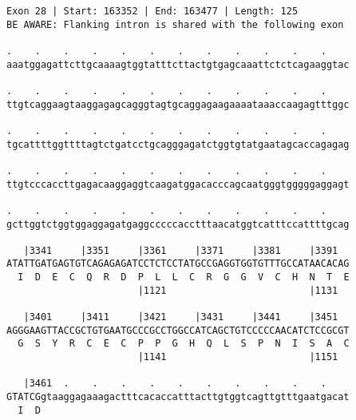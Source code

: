 \documentclass{article}
\begin{document}
\begin{Verbatim}
Exon 28 | Start: 163352 | End: 163477 | Length: 125
BE AWARE: Flanking intron is shared with the following exon
 
.    .    .    .    .    .    .    .    .    .    .    .    
aaatggagattcttgcaaaagtggtatttcttactgtgagcaaattctctcagaaggtac
  
.    .    .    .    .    .    .    .    .    .    .    .    
ttgtcaggaagtaaggagagcagggtagtgcaggagaagaaaataaaccaagagtttggc
  
.    .    .    .    .    .    .    .    .    .    .    .    
tgcattttggttttagtctgatcctgcagggagatctggtgtatgaatagcaccagagag
  
.    .    .    .    .    .    .    .    .    .    .    .    
ttgtcccaccttgagacaaggaggtcaagatggacacccagcaatgggtgggggaggagt
  
.    .    .    .    .    .    .    .    .    .    .    .    
gcttggtctggtggaggagatgaggcccccacctttaacatggtcatttccattttgcag
  
   |3341     |3351     |3361     |3371     |3381     |3391  
ATATTGATGAGTGTCAGAGAGATCCTCTCCTATGCCGAGGTGGTGTTTGCCATAACACAG
  I  D  E  C  Q  R  D  P  L  L  C  R  G  G  V  C  H  N  T  E
                       |1121                         |1131  
  
   |3401     |3411     |3421     |3431     |3441     |3451  
AGGGAAGTTACCGCTGTGAATGCCCGCCTGGCCATCAGCTGTCCCCCAACATCTCCGCGT
  G  S  Y  R  C  E  C  P  P  G  H  Q  L  S  P  N  I  S  A  C
                       |1141                         |1151  
  
   |3461  .    .    .    .    .    .    .    .    .    .    
GTATCGgtaaggagaaagactttcacaccatttacttgtggtcagttgtttgaatgacat
  I  D                                                      
\end{Verbatim}
\newpage
\end{document}
